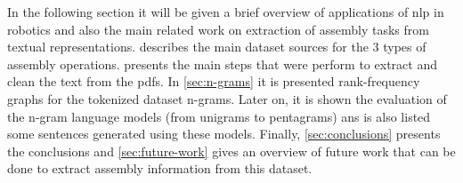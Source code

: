 In the following section it will be given a brief overview of applications of \gls{nlp} in robotics and also the main related work on extraction of assembly tasks from textual representations.  describes the main dataset sources for the 3 types of assembly operations.  presents the main steps that were perform to extract and clean the text from the \glspl{pdf}. In \cref{sec:n-grams} it is presented rank-frequency graphs for the tokenized dataset n-grams. Later on, it is shown the evaluation of the n-gram language models (from unigrams to pentagrams) ans is also listed some sentences generated using these models. Finally, \cref{sec:conclusions} presents the conclusions and \cref{sec:future-work} gives an overview of future work that can be done to extract assembly information from this dataset.
